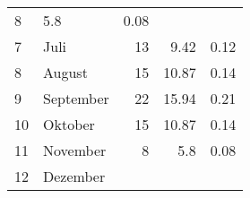 \begin{longtable}{lXrrr}
       \num{8} &
       \num[round-mode=places,round-precision=2]{5,8} &
         \num[round-mode=places,round-precision=2]{0,08} \\

     7 &
     \multicolumn{1}{X}{ Juli   } &


       \num{13} &
       \num[round-mode=places,round-precision=2]{9,42} &
         \num[round-mode=places,round-precision=2]{0,12} \\

     8 &
     \multicolumn{1}{X}{ August   } &


       \num{15} &
       \num[round-mode=places,round-precision=2]{10,87} &
         \num[round-mode=places,round-precision=2]{0,14} \\

     9 &
     \multicolumn{1}{X}{ September   } &


       \num{22} &
       \num[round-mode=places,round-precision=2]{15,94} &
         \num[round-mode=places,round-precision=2]{0,21} \\

     10 &
     \multicolumn{1}{X}{ Oktober   } &


       \num{15} &
       \num[round-mode=places,round-precision=2]{10,87} &
         \num[round-mode=places,round-precision=2]{0,14} \\

     11 &
     \multicolumn{1}{X}{ November   } &


       \num{8} &
       \num[round-mode=places,round-precision=2]{5,8} &
         \num[round-mode=places,round-precision=2]{0,08} \\

     12 &
     \multicolumn{1}{X}{ Dezember   } &



\end{longtable}
